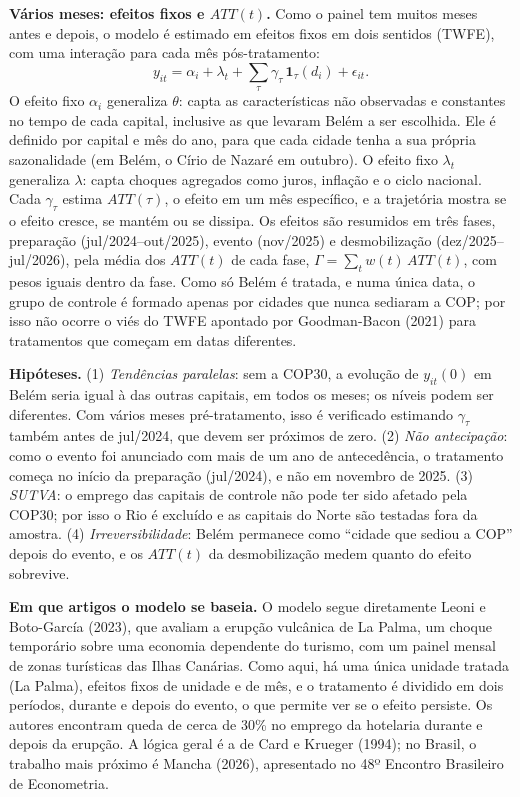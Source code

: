 \documentclass[12pt,a4paper]{article}
\begin{document}
\textbf{Vários meses: efeitos fixos e $ATT(t)$.} Como o painel tem muitos meses antes e depois, o modelo
é estimado em efeitos fixos em dois sentidos (TWFE), com uma interação para cada mês pós-tratamento:
\begin{equation}
y_{it} = \alpha_i + \lambda_t + \sum_{\tau} \gamma_\tau \, \mathbf{1}_\tau(d_i) + \epsilon_{it}.
\end{equation}
O efeito fixo $\alpha_i$ generaliza $\theta$: capta as características não observadas e constantes no
tempo de cada capital, inclusive as que levaram Belém a ser escolhida. Ele é definido por capital e mês
do ano, para que cada cidade tenha a sua própria sazonalidade (em Belém, o Círio de Nazaré em outubro).
O efeito fixo $\lambda_t$ generaliza $\lambda$: capta choques agregados como juros, inflação e o ciclo
nacional. Cada $\gamma_\tau$ estima $ATT(\tau)$, o efeito em um mês específico, e a trajetória mostra se
o efeito cresce, se mantém ou se dissipa. Os efeitos são resumidos em três fases, preparação
(jul/2024--out/2025), evento (nov/2025) e desmobilização (dez/2025--jul/2026), pela média dos
$ATT(t)$ de cada fase, $\Gamma = \sum_t w(t)\,ATT(t)$, com pesos iguais dentro da fase. Como só Belém é tratada, e numa única
data, o grupo de controle é formado apenas por cidades que nunca sediaram a COP; por isso não ocorre o
viés do TWFE apontado por Goodman-Bacon (2021) para tratamentos que começam em datas diferentes.

\textbf{Hipóteses.} (1) \textit{Tendências paralelas}: sem a COP30, a evolução de $y_{it}(0)$ em
Belém seria igual à das outras capitais, em todos os meses; os níveis podem ser diferentes. Com vários
meses pré-tratamento, isso é verificado estimando $\gamma_\tau$ também antes de jul/2024, que devem ser
próximos de zero. (2) \textit{Não antecipação}: como o evento foi anunciado com mais de um ano de
antecedência, o tratamento começa no início da preparação (jul/2024), e não em novembro de 2025.
(3) \textit{SUTVA}: o emprego das capitais de controle não pode ter sido afetado pela COP30; por isso o
Rio é excluído e as capitais do Norte são testadas fora da amostra. (4) \textit{Irreversibilidade}:
Belém permanece como ``cidade que sediou a COP'' depois do evento, e os $ATT(t)$ da desmobilização medem
quanto do efeito sobrevive.

\textbf{Em que artigos o modelo se baseia.} O modelo segue diretamente Leoni e Boto-García (2023), que
avaliam a erupção vulcânica de La Palma, um choque temporário sobre uma economia dependente do turismo,
com um painel mensal de zonas turísticas das Ilhas Canárias. Como aqui, há uma única unidade tratada
(La Palma), efeitos fixos de unidade e de mês, e o tratamento é dividido em dois períodos, durante e
depois do evento, o que permite ver se o efeito persiste. Os autores encontram queda de cerca de
30\% no emprego da hotelaria durante e depois da erupção. A lógica geral é a de Card e Krueger (1994); no Brasil, o
trabalho mais próximo é Mancha (2026), apresentado no 48º Encontro Brasileiro de Econometria.
\end{document}
